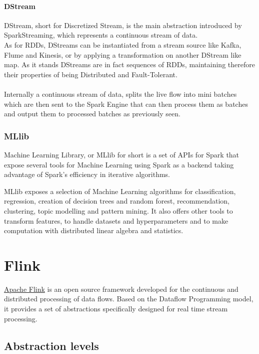 \paragraph{DStream}

DStream, short for Discretized Stream, is the main abstraction introduced by SparkStreaming, which represents a continuous stream of data. \\
As for RDDs, DStreams can be instantiated from a stream source like Kafka, Flume and Kinesis, or by applying a transformation on another DStream like map. As it stands DStreams are in fact sequences of RDDs, maintaining therefore their properties of being Distributed and Fault-Tolerant.
\\ \\
Internally a continuous stream of data, splits the live flow into mini batches which are then sent to the Spark Engine that can then process them as batches and output them to processed batches as previously seen.

\subsubsection{MLlib}

Machine Learning Library, or MLlib for short is a set of APIs for Spark that expose several tools for Machine Learning using Spark as a backend taking advantage of Spark's efficiency in iterative algorithms.

MLlib exposes a selection of Machine Learning algorithms for classification, regression, creation of decision trees and random forest, recommendation, clustering, topic modelling and pattern mining.
It also offers other tools to transform features, to handle datasets and hyperparameters and to make computation with distributed linear algebra and statistics.

\pagebreak
\section{Flink}\label{Flink}

\href{https://flink.apache.org/}{Apache Flink} \cite{flink_doc} is an open source framework developed for the continuous and distributed processing of data flows. Based on the Dataflow Programming model, it provides a set of abstractions specifically designed for real time stream processing.

\subsection{Abstraction levels}  \label{AbstractionLevels}

